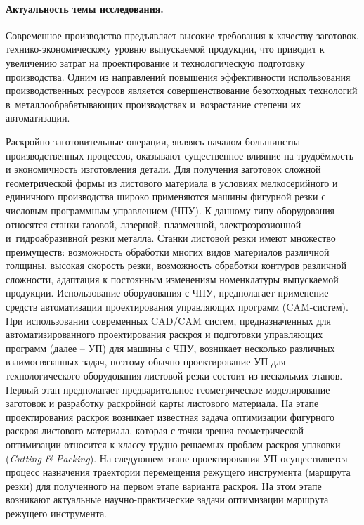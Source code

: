 \paragraph*{Актуальность темы исследования.}

Современное производство предъявляет высокие требования к качеству заготовок,
технико-экономическому уровню выпускаемой продукции,
что приводит к увеличению затрат на проектирование и технологическую подготовку производства.
Одним из направлений повышения эффективности использования
производственных ресурсов является совершенствование безотходных технологий
в~металлообрабатывающих производствах и~возрастание степени их автоматизации.

Раскройно-заготовительные операции,
являясь началом большинства производственных процессов,
оказывают существенное влияние на трудоёмкость
и экономичность изготовления детали.
Для получения заготовок сложной
геометрической формы из листового материала в условиях мелкосерийного и
единичного производства широко применяются машины фигурной резки с
числовым программным управлением
(ЧПУ).
К данному типу оборудования
относятся станки газовой, лазерной, плазменной, электроэрозионной
и~гидроабразивной резки металла.
Станки листовой резки имеют множество преимуществ:
возможность обработки многих видов материалов различной толщины,
высокая скорость резки, возможность обработки контуров различной сложности,
адаптация к постоянным изменениям номенклатуры выпускаемой продукции.
Использование оборудования с ЧПУ, предполагает применение
средств автоматизации проектирования управляющих программ
(CAM-систем).
При использовании современных CAD/CAM систем, предназначенных для
автоматизированного проектирования раскроя и подготовки
управляющих программ
(далее -- УП)
для машины с ЧПУ, возникает несколько различных взаимосвязанных задач,
поэтому обычно
проектирование УП для технологического оборудования листовой резки
состоит из нескольких этапов.
Первый этап предполагает предварительное геометрическое моделирование заготовок
и разработку раскройной карты листового материала.
На этапе проектирования раскроя возникает известная задача оптимизации фигурного раскроя листового материала,
которая с точки зрения геометрической оптимизации
относится к классу трудно решаемых проблем раскроя-упаковки
(\textit{Cutting \& Packing}).
На следующем этапе проектирования УП осуществляется процесс назначения траектории
перемещения режущего инструмента
(маршрута резки)
для полученного на первом этапе варианта раскроя.
На этом этапе возникают актуальные научно-практические задачи
оптимизации маршрута режущего инструмента.
